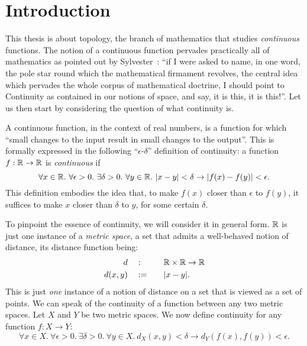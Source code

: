\chapter{Introduction}\label{chap:intro}

This thesis is about topology, the branch of mathematics that studies \emph{continuous}
functions. The notion of a continuous function pervades practically all of mathematics as
pointed out by Sylvester~\cite[pg.~27]{armstrong-topology}: ``if I were asked to name, in
one word, the pole star round which the mathematical firmament revolves, the central idea
which pervades the whole corpus of mathematical doctrine, I should point to Continuity as
contained in our notions of space, and say, it is this, it is this!''. Let us then start
by considering the question of what continuity is.

A continuous function, in the context of real numbers, is a function for which ``small
changes to the input result in small changes to the output''. This is formally expressed
in the following ``$\epsilon$-$\delta$'' definition of continuity: a function $f : \mathbb{R}{} \rightarrow
\mathbb{R}{}$ is
\emph{continuous} if
\begin{equation*}\label{eq:cont-0}
  \forall x \in \mathbb{R}{}.~ \forall \epsilon > 0.~ \exists \delta > 0.~ \forall y \in \mathbb{R}{}.~
    | x - y | < \delta \rightarrow | f(x) - f(y) | < \epsilon.
\end{equation*}
This definition embodies the idea that, to make $f(x)$ closer than $\epsilon$ to
$f(y)$, it suffices to make $x$ closer than $\delta$ to $y$, for some certain $\delta$.

To pinpoint the essence of continuity, we will consider it in general form. $\mathbb{R}{}$ is
just one instance of a \emph{metric space}, a set that admits a well-behaved notion of
distance, its distance function being:
\begin{alignat*}{2}
  d       \quad&:\quad  && \mathbb{R}{} \times \mathbb{R}{} \rightarrow \mathbb{R}{} \\
  d(x, y) \quad&:=\quad && | x - y |                      .
\end{alignat*}
This is just \emph{one} instance of a notion of distance on a set that is viewed as a set
of points. We can speak of the continuity of a function between any two metric spaces. Let
$X$ and $Y$ be two metric spaces. We now define continuity for any function $f : X \rightarrow Y$:
\begin{equation}\label{cont-1}
  \forall x \in X.~ \forall \epsilon > 0.~ \exists \delta > 0.~ \forall y \in X.~ d_X(x, y) < \delta \rightarrow d_Y(f(x), f(y)) < \epsilon.
\end{equation}


